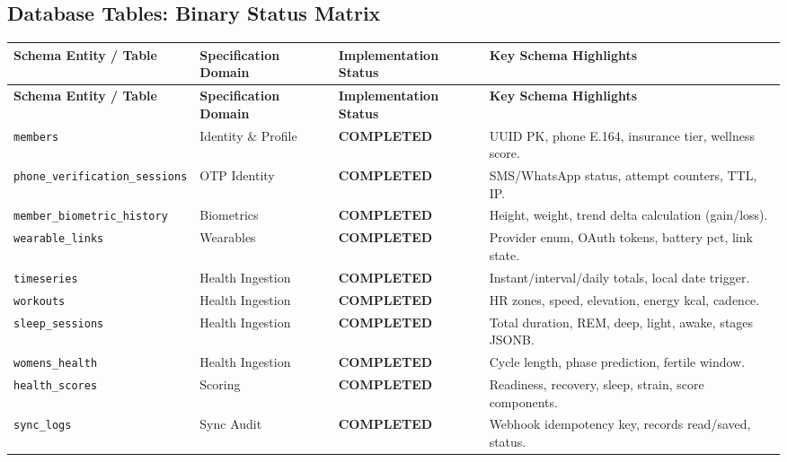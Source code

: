 \documentclass[11pt,a4paper]{article}
\begin{document}
\subsection{Database Tables: Binary Status Matrix}
\begin{longtable}{p{4.5cm} p{3.2cm} p{3.2cm} p{3.8cm}}
    \toprule
    \textbf{Schema Entity / Table} & \textbf{Specification Domain} & \textbf{Implementation Status} & \textbf{Key Schema Highlights} \\
    \midrule
    \endfirsthead
    \toprule
    \textbf{Schema Entity / Table} & \textbf{Specification Domain} & \textbf{Implementation Status} & \textbf{Key Schema Highlights} \\
    \midrule
    \endhead

    \texttt{members} & Identity \& Profile & \textcolor{statuscompleted}{\textbf{COMPLETED}} & UUID PK, phone E.164, insurance tier, wellness score. \\
    \texttt{phone\_verification\_sessions} & OTP Identity & \textcolor{statuscompleted}{\textbf{COMPLETED}} & SMS/WhatsApp status, attempt counters, TTL, IP. \\
    \texttt{member\_biometric\_history} & Biometrics & \textcolor{statuscompleted}{\textbf{COMPLETED}} & Height, weight, trend delta calculation (gain/loss). \\
    \texttt{wearable\_links} & Wearables & \textcolor{statuscompleted}{\textbf{COMPLETED}} & Provider enum, OAuth tokens, battery pct, link state. \\
    \texttt{timeseries} & Health Ingestion & \textcolor{statuscompleted}{\textbf{COMPLETED}} & Instant/interval/daily totals, local date trigger. \\
    \texttt{workouts} & Health Ingestion & \textcolor{statuscompleted}{\textbf{COMPLETED}} & HR zones, speed, elevation, energy kcal, cadence. \\
    \texttt{sleep\_sessions} & Health Ingestion & \textcolor{statuscompleted}{\textbf{COMPLETED}} & Total duration, REM, deep, light, awake, stages JSONB. \\
    \texttt{womens\_health} & Health Ingestion & \textcolor{statuscompleted}{\textbf{COMPLETED}} & Cycle length, phase prediction, fertile window. \\
    \texttt{health\_scores} & Scoring & \textcolor{statuscompleted}{\textbf{COMPLETED}} & Readiness, recovery, sleep, strain, score components. \\
    \texttt{sync\_logs} & Sync Audit & \textcolor{statuscompleted}{\textbf{COMPLETED}} & Webhook idempotency key, records read/saved, status. \\

\end{longtable}
\end{document}
